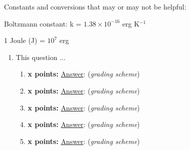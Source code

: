 \documentclass[12pt]{article}
\begin{document}
Constants and conversions that may or may not be helpful:
\begin{itemize*}
    \item Boltzmann constant: k = $1.38\times10^{-16}$ erg K$^{-1}$
    \item 1 Joule (J) = $10^{7}$ erg
\end{itemize*}

\newpage

\begin{enumerate}
    \item This question $\ldots$
        \begin{enumerate}
            \item \textbf{x points:}
                {\small\underline{Answer}:
                (\emph{grading scheme})}
            \item \textbf{x points:}
                {\small\underline{Answer}:
                (\emph{grading scheme})}
            \item \textbf{x points:}
                {\small\underline{Answer}:
                (\emph{grading scheme})}
            \item \textbf{x points:}
                {\small\underline{Answer}:
                (\emph{grading scheme})}
            \item \textbf{x points:}
                {\small\underline{Answer}:
                (\emph{grading scheme})}
        \end{enumerate}
\end{enumerate}
\end{document}
